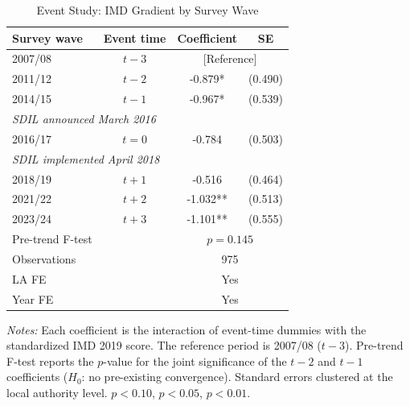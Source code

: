 \begin{table}[H]
\centering
\caption{Event Study: IMD Gradient by Survey Wave}
\label{tab:event}
\begin{threeparttable}
\begin{tabular}{lccc}
\toprule
Survey wave & Event time & Coefficient & SE \\
\midrule
2007/08 & $t-3$ & \multicolumn{2}{c}{[Reference]} \\
2011/12 & $t-2$ & -0.879* & (0.490) \\
2014/15 & $t-1$ & -0.967* & (0.539) \\
\midrule
\multicolumn{4}{l}{\textit{SDIL announced March 2016}} \\
2016/17 & $t=0$ & -0.784 & (0.503) \\
\multicolumn{4}{l}{\textit{SDIL implemented April 2018}} \\
2018/19 & $t+1$ & -0.516 & (0.464) \\
2021/22 & $t+2$ & -1.032** & (0.513) \\
2023/24 & $t+3$ & -1.101** & (0.555) \\
\midrule
Pre-trend F-test & & \multicolumn{2}{c}{$p = 0.145$} \\
Observations & & \multicolumn{2}{c}{975} \\
LA FE & & \multicolumn{2}{c}{Yes} \\
Year FE & & \multicolumn{2}{c}{Yes} \\
\bottomrule
\end{tabular}
\begin{tablenotes}[flushleft]
\small
\item \textit{Notes:} Each coefficient is the interaction of event-time dummies with the standardized IMD 2019 score. The reference period is 2007/08 ($t-3$). Pre-trend F-test reports the $p$-value for the joint significance of the $t-2$ and $t-1$ coefficients ($H_0$: no pre-existing convergence). Standard errors clustered at the local authority level. \sym{*} $p<0.10$, \sym{**} $p<0.05$, \sym{***} $p<0.01$.
\end{tablenotes}
\end{threeparttable}
\end{table}

